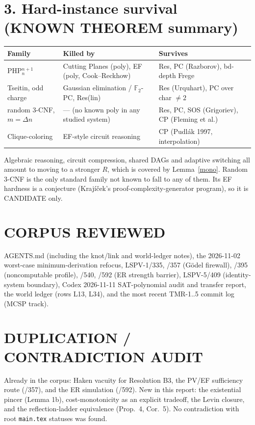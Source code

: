 \documentclass[11pt]{article}
\begin{document}
\section*{3. Hard-instance survival (KNOWN THEOREM summary)}
\begin{tabular}{@{}lll@{}}\toprule
Family & Killed by & Survives \\\midrule
PHP$^{n+1}_n$ & Cutting Planes (poly), EF (poly, Cook--Reckhow) & Res, PC (Razborov), bd-depth Frege \\
Tseitin, odd charge & Gaussian elimination / $\mathbb F_2$-PC, Res(lin) & Res (Urquhart), PC over char $\ne 2$ \\
random 3-CNF, $m=\Delta n$ & --- (no known poly in any studied system) & Res, PC, SOS (Grigoriev), CP (Fleming et al.) \\
Clique-coloring & EF-style circuit reasoning & CP (Pudlák 1997, interpolation) \\
\bottomrule\end{tabular}

\noindent Algebraic reasoning, circuit compression, shared DAGs and adaptive switching all amount to moving to a
stronger $R$, which is covered by Lemma~\ref{mono}. Random 3-CNF is the only standard family not known to fall to any of
them. Its EF hardness is a conjecture (Krajíček's proof-complexity-generator program), so it is CANDIDATE only.

\section*{CORPUS REVIEWED}
AGENTS.md (including the knot/link and world-ledger notes), the 2026-11-02 worst-case minimum-derivation refocus,
LSPV-1/335, /357 (Gödel firewall), /395 (noncomputable profile), /540, /592 (ER strength barrier),
LSPV-5/409 (identity-system boundary), Codex 2026-11-11 SAT-polynomial audit and transfer report,
the world ledger (rows L13, L34), and the most recent TMR-1..5 commit log (MCSP track).
\section*{DUPLICATION / CONTRADICTION AUDIT}
Already in the corpus: Haken vacuity for Resolution B3, the PV/EF sufficiency route (/357), and the ER simulation (/592).
New in this report: the existential pincer (Lemma 1b), cost-monotonicity as an explicit tradeoff, the Levin closure,
and the reflection-ladder equivalence (Prop.~4, Cor.~5). No contradiction with root \texttt{main.tex} statuses was found.
\end{document}
